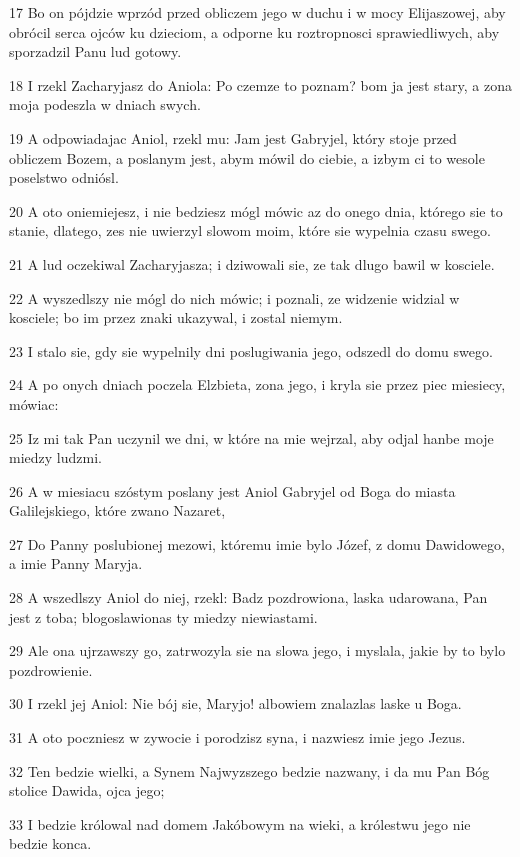 \par 17 Bo on pójdzie wprzód przed obliczem jego w duchu i w mocy Elijaszowej, aby obrócil serca ojców ku dzieciom, a odporne ku roztropnosci sprawiedliwych, aby sporzadzil Panu lud gotowy.
\par 18 I rzekl Zacharyjasz do Aniola: Po czemze to poznam? bom ja jest stary, a zona moja podeszla w dniach swych.
\par 19 A odpowiadajac Aniol, rzekl mu: Jam jest Gabryjel, który stoje przed obliczem Bozem, a poslanym jest, abym mówil do ciebie, a izbym ci to wesole poselstwo odniósl.
\par 20 A oto oniemiejesz, i nie bedziesz mógl mówic az do onego dnia, którego sie to stanie, dlatego, zes nie uwierzyl slowom moim, które sie wypelnia czasu swego.
\par 21 A lud oczekiwal Zacharyjasza; i dziwowali sie, ze tak dlugo bawil w kosciele.
\par 22 A wyszedlszy nie mógl do nich mówic; i poznali, ze widzenie widzial w kosciele; bo im przez znaki ukazywal, i zostal niemym.
\par 23 I stalo sie, gdy sie wypelnily dni poslugiwania jego, odszedl do domu swego.
\par 24 A po onych dniach poczela Elzbieta, zona jego, i kryla sie przez piec miesiecy, mówiac:
\par 25 Iz mi tak Pan uczynil we dni, w które na mie wejrzal, aby odjal hanbe moje miedzy ludzmi.
\par 26 A w miesiacu szóstym poslany jest Aniol Gabryjel od Boga do miasta Galilejskiego, które zwano Nazaret,
\par 27 Do Panny poslubionej mezowi, któremu imie bylo Józef, z domu Dawidowego, a imie Panny Maryja.
\par 28 A wszedlszy Aniol do niej, rzekl: Badz pozdrowiona, laska udarowana, Pan jest z toba; blogoslawionas ty miedzy niewiastami.
\par 29 Ale ona ujrzawszy go, zatrwozyla sie na slowa jego, i myslala, jakie by to bylo pozdrowienie.
\par 30 I rzekl jej Aniol: Nie bój sie, Maryjo! albowiem znalazlas laske u Boga.
\par 31 A oto poczniesz w zywocie i porodzisz syna, i nazwiesz imie jego Jezus.
\par 32 Ten bedzie wielki, a Synem Najwyzszego bedzie nazwany, i da mu Pan Bóg stolice Dawida, ojca jego;
\par 33 I bedzie królowal nad domem Jakóbowym na wieki, a królestwu jego nie bedzie konca.
